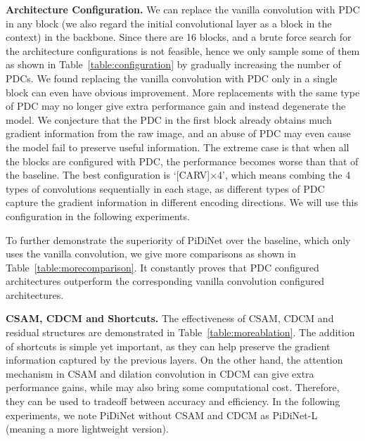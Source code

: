 \documentclass[10pt,twocolumn,letterpaper]{article}
\begin{document}
\vspace{0.3em}
\noindent \textbf{Architecture Configuration.} \quad We can replace the vanilla convolution with PDC in any block (we also regard the initial convolutional layer as a block in the context) in the backbone. Since there are 16 blocks, and a brute force search for the architecture configurations is not feasible, hence we only sample some of them as shown in Table~\ref{table:configuration} by gradually increasing the number of PDCs. We found replacing the vanilla convolution with PDC only in a single block can even have obvious improvement. More replacements with the same type of PDC may no longer give extra performance gain and instead degenerate the model. We conjecture that the PDC in the first block already obtains much gradient information from the raw image, and an abuse of PDC may even cause the model fail to preserve useful information. The extreme case is that when all the blocks are configured with PDC, the performance becomes worse than that of the baseline. The best configuration is `[CARV]$\times$4', which means combing the 4 types of convolutions sequentially in each stage, as different types of PDC capture the gradient information in different encoding directions. We will use this configuration in the following experiments. 

To further demonstrate the superiority of PiDiNet over the baseline, which only uses the vanilla convolution, we give more comparisons as shown in Table~\ref{table:morecomparison}. It constantly proves that PDC configured architectures outperform the corresponding vanilla convolution configured architectures.

\vspace{0.3em}
\noindent \textbf{CSAM, CDCM and Shortcuts.} \quad The effectiveness of CSAM, CDCM and residual structures are demonstrated in Table~\ref{table:moreablation}. The addition of shortcuts is simple yet important, as they can help preserve the gradient information captured by the previous layers. On the other hand, the attention mechanism in CSAM and dilation convolution in CDCM can give extra performance gains, while may also bring some computational cost. Therefore, they can be used to tradeoff between accuracy and efficiency. In the following experiments, we note PiDiNet without CSAM and CDCM as PiDiNet-L (meaning a more lightweight version).
\end{document}
